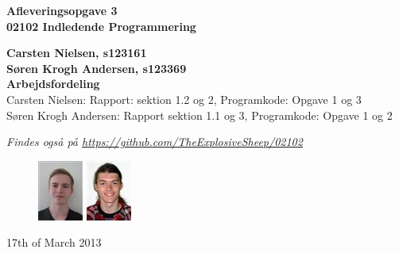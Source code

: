 \thispagestyle{empty} %
\begin{center}
\textbf{\Huge {Afleveringsopgave 3}\\ \vspace{1cm}
\huge{02102 Indledende Programmering}}
\end{center}
\vspace{1cm}
\begin{center}
\Large{\textbf{Carsten Nielsen, s123161 \\ Søren Krogh Andersen, s123369}} \\
\vspace{1cm}
\Large{\textbf{Arbejdsfordeling}} \\
Carsten Nielsen: Rapport: sektion 1.2 og 2, Programkode: Opgave 1 og 3 \\
Søren Krogh Andersen: Rapport sektion 1.1 og 3, Programkode: Opgave 1 og 2

\emph{Findes også på \url{https://github.com/TheExplosiveSheep/02102}}
\end{center}
\vspace{6cm}
\begin{figure}[h]
\hfill
\includegraphics{s123161.png}%
\includegraphics{s123369.png}%
\end{figure}
17th of March 2013

\thispagestyle{empty}
\newpage

